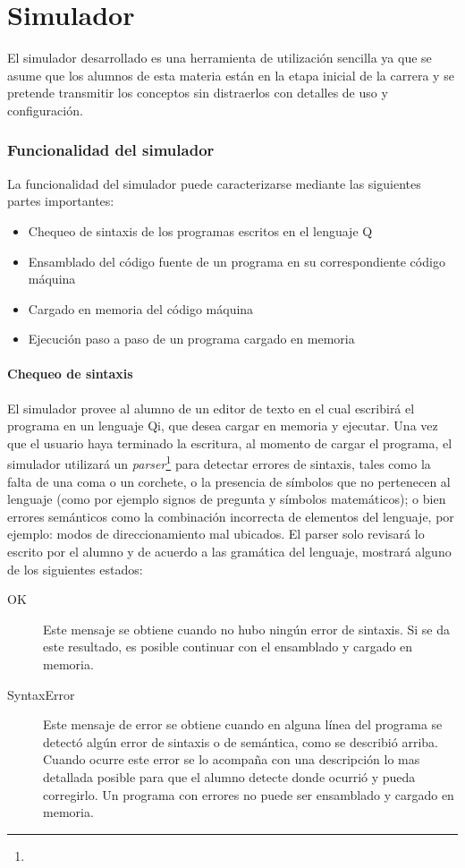 \part{Simulador \qsim}


El simulador desarrollado es una herramienta de utilización sencilla ya que se asume que los alumnos de esta materia están en la etapa inicial de la carrera y se pretende transmitir los conceptos sin distraerlos con detalles de uso y configuración.

\section{Funcionalidad del simulador}

La funcionalidad del simulador puede caracterizarse mediante las siguientes partes importantes:

\begin{itemize}
\item Chequeo de sintaxis de los programas escritos en el lenguaje Q
\item Ensamblado del código fuente de un programa en su correspondiente código máquina
\item Cargado en memoria del código máquina
\item Ejecución paso a paso de un programa cargado en memoria
\end{itemize}

\subsection{Chequeo de sintaxis}\label{parser}

El simulador provee al alumno de un editor de texto en el cual escribirá el programa en un lenguaje Qi, que desea cargar en memoria y ejecutar.
Una vez que el usuario haya terminado la escritura, al momento de cargar el programa, el simulador utilizará un \textit{parser}\footnote{} para detectar errores de sintaxis, tales como la falta de una coma o un corchete, o la presencia de símbolos que no pertenecen al lenguaje (como por ejemplo signos de pregunta y símbolos matemáticos); o bien errores semánticos como la combinación incorrecta de elementos del lenguaje, por ejemplo: modos de direccionamiento mal ubicados.
El parser solo revisará lo escrito por el alumno y de acuerdo a las gramática del lenguaje, mostrará alguno de los siguientes estados:

\begin{description}
\item[OK] Este mensaje se obtiene cuando no hubo ningún error de sintaxis. Si se da este resultado, es posible continuar con el ensamblado y cargado en memoria.
\item[SyntaxError] Este mensaje de error se obtiene cuando en alguna línea del programa se detectó algún error de sintaxis o de semántica, como se describió arriba. Cuando ocurre este error se lo acompaña con una descripción lo mas detallada posible para que el alumno detecte donde ocurrió y pueda corregirlo. Un programa con errores no puede ser ensamblado y cargado en memoria.
\end{description}

